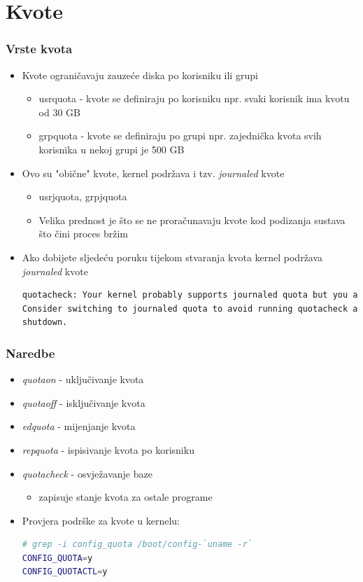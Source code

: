 \documentclass[croatian,t]{beamer} %
\begin{document}
    \section{Kvote}
	\begin{frame}[fragile]
	\frametitle{Vrste kvota}
		\begin{itemize}
			\item Kvote ograničavaju zauzeće diska po korisniku ili grupi
			\begin{itemize}
				\item usrquota - kvote se definiraju po korisniku npr. svaki korisnik ima kvotu od 30 GB
				\item grpquota - kvote se definiraju po grupi npr. zajednička kvota svih korisnika u nekoj grupi je 500 GB
			\end{itemize}
			\item Ovo su "obične" kvote, kernel podržava i tzv. \textit{journaled} kvote
			\begin{itemize}
				\item usrjquota, grpjquota
				\item Velika prednost je što se ne proračunavaju kvote kod podizanja sustava što čini proces bržim
			\end{itemize}
			\item Ako dobijete sljedeću poruku tijekom stvaranja kvota kernel podržava \textit{journaled} kvote
			\begin{lstlisting}[basicstyle={\tiny\ttfamily},language=bash]
quotacheck: Your kernel probably supports journaled quota but you are not using it.
Consider switching to journaled quota to avoid running quotacheck after an unclean
shutdown.
			\end{lstlisting}
		\end{itemize}
	\end{frame}

	\begin{frame}[fragile]
	\frametitle{Naredbe}
		\begin{itemize}
			\item \textit{quotaon} - uključivanje kvota
			\item \textit{quotaoff} - isključivanje kvota
			\item \textit{edquota} - mijenjanje kvota
			\item \textit{repquota} - ispisivanje kvota po korisniku
			\item \textit{quotacheck} - osvježavanje baze
			\begin{itemize}
				\item zapisuje stanje kvota za ostale programe
			\end{itemize}
			\item Provjera podrške za kvote u kernelu:
			\begin{lstlisting}[basicstyle={\tiny\ttfamily},language=bash]
# grep -i config_quota /boot/config-`uname -r`
CONFIG_QUOTA=y
CONFIG_QUOTACTL=y
			\end{lstlisting}
		\end{itemize}
	\end{frame}
	
\end{document}
